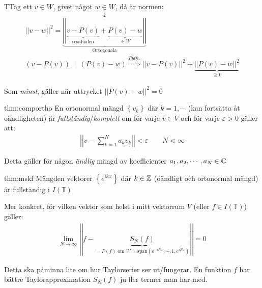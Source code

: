 \par\bigskip
\begin{prf}
  TTag ett $v\in W$, givet något $w\in W$, då är normen:
  \begin{equation*}
    \begin{gathered}
      \left|\left|v-w\right|\right|^2 = \underbrace{\left|\left|\underbrace{v-P(v)}_{\text{residualen}}+\underbrace{P(v)-w}_{\text{$\in W$}}\right|\right|}_{\text{Ortogonala}}^2\\
      (v-P(v))\perp(P(v)-w)\stackrel{Pyth.}{\Rightarrow}\left|\left|v-P(v)\right|\right|^2+\underbrace{\left|\left|P(v)-w\right|\right|^2}_{\text{$\geq0$}}
    \end{gathered}
  \end{equation*}\par
  \noindent Som \textit{minst}, gäller när uttrycket $\left|\left|P(v)-w\right|\right|^2 = 0$
\end{prf}
\par\bigskip
\begin{theo}{thm:comportho}
  En ortonormal mängd $\left\{v_k\right\}$ där $k=1,\cdots$ (kan fortsätta åt oändligheten) är \textit{fullständig}/\textit{komplett} om för varje $v\in V$ och för varje $\varepsilon>0$ gäller att:
  \begin{equation*}
    \begin{gathered}
      \left|\left|v-\sum_{k=1}^{N}a_kv_k\right|\right|<\varepsilon\qquad N<\infty
    \end{gathered}
  \end{equation*}
  \par\bigskip
  \noindent Detta gäller för någon \textit{ändlig} mängd av koefficienter $a_1,a_2,\cdots,a_N\in\mathbb{C}$ 
\end{theo}
\newpage
\begin{theo}{thm:mskf}
  Mängden vektorer $\left\{e^{ikx}\right\}$ där $k\in\mathbb{Z}$ (oändligt och ortonormal mängd) är fullständig i $I(\mathbb{T})$
  \par\bigskip
  \noindent Mer konkret, för vilken vektor som helst i mitt vektorrum $V$ (eller $f\in I(\mathbb{T})$) gäller:
  \begin{equation*}
    \begin{gathered}
      \lim_{N\to\infty}\left|\left|f-\underbrace{S_N(f)}_{\text{$=P(f)$ om $W=$span$(e^{-iNx},\cdots,1,e^{iNx})$}}\right|\right| = 0
    \end{gathered}
  \end{equation*}
  \par\bigskip
  \noindent Detta ska påminna lite om hur Taylorserier ser ut/fungerar. En funktion $f$ har bättre Taylorapproximation $S_N(f)$ ju fler termer man har med.
\end{theo}

